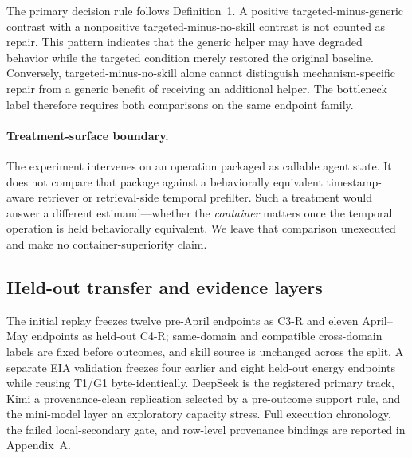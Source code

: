 The primary decision rule follows Definition~1. A positive targeted-minus-generic contrast with a nonpositive targeted-minus-no-skill contrast is not counted as repair. This pattern indicates that the generic helper may have degraded behavior while the targeted condition merely restored the original baseline. Conversely, targeted-minus-no-skill alone cannot distinguish mechanism-specific repair from a generic benefit of receiving an additional helper. The bottleneck label therefore requires both comparisons on the same endpoint family.

\paragraph{Treatment-surface boundary.}
The experiment intervenes on an operation packaged as callable agent state. It does not compare that package against a behaviorally equivalent timestamp-aware retriever or retrieval-side temporal prefilter. Such a treatment would answer a different estimand---whether the \emph{container} matters once the temporal operation is held behaviorally equivalent. We leave that comparison unexecuted and make no container-superiority claim.

\subsection{Held-out transfer and evidence layers}
The initial replay freezes twelve pre-April endpoints as C3-R and eleven April--May endpoints as held-out C4-R; same-domain and compatible cross-domain labels are fixed before outcomes, and skill source is unchanged across the split. A separate EIA validation freezes four earlier and eight held-out energy endpoints while reusing T1/G1 byte-identically. DeepSeek is the registered primary track, Kimi a provenance-clean replication selected by a pre-outcome support rule, and the mini-model layer an exploratory capacity stress. Full execution chronology, the failed local-secondary gate, and row-level provenance bindings are reported in Appendix~A.
